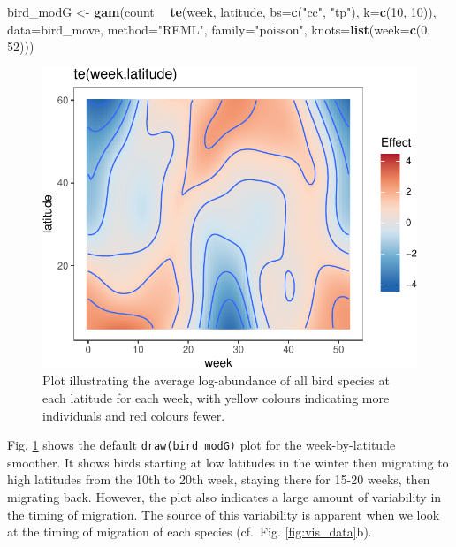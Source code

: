 \documentclass[12pt]{article}
\newenvironment{Shaded}{\begin{snugshade}}{\end{snugshade}}
\newcommand{\KeywordTok}[1]{\textcolor[rgb]{0.13,0.29,0.53}{\textbf{#1}}}
\newcommand{\DataTypeTok}[1]{\textcolor[rgb]{0.13,0.29,0.53}{#1}}
\newcommand{\DecValTok}[1]{\textcolor[rgb]{0.00,0.00,0.81}{#1}}
\newcommand{\StringTok}[1]{\textcolor[rgb]{0.31,0.60,0.02}{#1}}
\newcommand{\OperatorTok}[1]{\textcolor[rgb]{0.81,0.36,0.00}{\textbf{#1}}}
\newcommand{\NormalTok}[1]{#1}
\begin{document}
\begin{Shaded}
\begin{Highlighting}[]
\NormalTok{bird_modG <-}\StringTok{ }\KeywordTok{gam}\NormalTok{(count }\OperatorTok{~}\StringTok{ }\KeywordTok{te}\NormalTok{(week, latitude, }\DataTypeTok{bs=}\KeywordTok{c}\NormalTok{(}\StringTok{"cc"}\NormalTok{, }\StringTok{"tp"}\NormalTok{), }\DataTypeTok{k=}\KeywordTok{c}\NormalTok{(}\DecValTok{10}\NormalTok{, }\DecValTok{10}\NormalTok{)),}
                 \DataTypeTok{data=}\NormalTok{bird_move, }\DataTypeTok{method=}\StringTok{"REML"}\NormalTok{, }\DataTypeTok{family=}\StringTok{"poisson"}\NormalTok{,}
                 \DataTypeTok{knots=}\KeywordTok{list}\NormalTok{(}\DataTypeTok{week=}\KeywordTok{c}\NormalTok{(}\DecValTok{0}\NormalTok{, }\DecValTok{52}\NormalTok{)))}
\end{Highlighting}
\end{Shaded}

\begin{figure}
\centering
\includegraphics{../figures/bird_modG_plot-1.pdf}
\caption{\label{fig:bird_modG} Plot illustrating the average
log-abundance of all bird species at each latitude for each week, with
yellow colours indicating more individuals and red colours fewer.}
\end{figure}

Fig, \ref{fig:bird_modG} shows the default \texttt{draw(bird\_modG)}
plot for the week-by-latitude smoother. It shows birds starting at low
latitudes in the winter then migrating to high latitudes from the 10th
to 20th week, staying there for 15-20 weeks, then migrating back.
However, the plot also indicates a large amount of variability in the
timing of migration. The source of this variability is apparent when we
look at the timing of migration of each species (cf.~Fig.
\ref{fig:vis_data}b).
\end{document}
